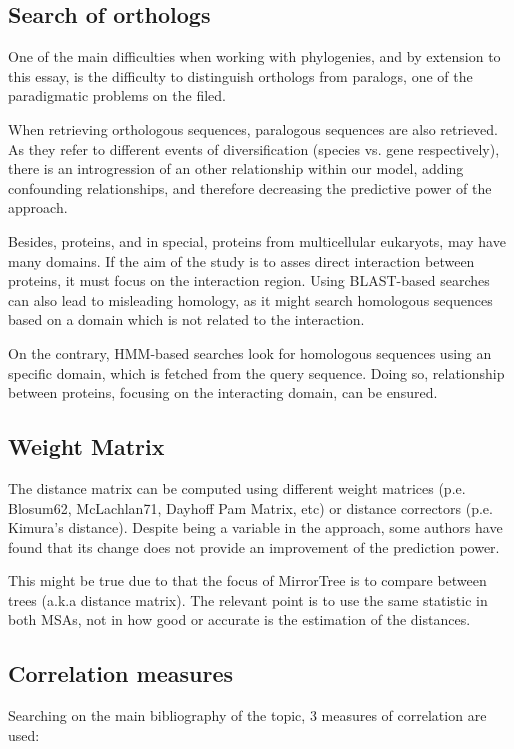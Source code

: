\documentclass[11pt]{article}
\begin{document}
\subsection{Search of orthologs}
One of the main difficulties when working with phylogenies, and by extension to this essay, is the difficulty to distinguish orthologs from paralogs, one of the paradigmatic problems on the filed. 

When retrieving orthologous sequences, paralogous sequences are also retrieved. As they refer to different events of diversification (species vs. gene respectively), there is an introgression of an other relationship within our model, adding confounding relationships, and therefore decreasing the predictive power of the approach.

Besides, proteins, and in special, proteins from multicellular eukaryots, may have many domains. If the aim of the study is to asses direct interaction between proteins, it must focus on the interaction region. Using BLAST-based searches can also lead to misleading homology, as it might search homologous sequences based on a domain which is not related to the interaction.

On the contrary, HMM-based searches look for homologous sequences using an specific domain, which is fetched from the query sequence. Doing so, relationship between proteins, focusing on the interacting domain, can be ensured.


\subsection{Weight Matrix}
The distance matrix can be computed using different weight matrices (p.e. Blosum62, McLachlan71, Dayhoff Pam Matrix, etc) or distance correctors (p.e. Kimura's distance). Despite being a variable in the approach, some authors\cite{Zhou13} have found that its change does not provide an improvement of the prediction power.

This might be true due to that the focus of MirrorTree is to compare between trees (a.k.a distance matrix). The relevant point is to use the same statistic in both MSAs, not in how good or accurate is the estimation of the distances.

\subsection{Correlation measures}
Searching on the main bibliography of the topic, 3 measures of correlation are used:
\end{document}
